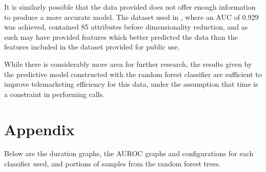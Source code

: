\documentclass[prodmode]{acmsmall} %
\begin{document}
It is similarly possible that the data provided does not offer enough
information to produce a more accurate model. The dataset used in \cite{paper}, where an
AUC of $0.929$ was achieved, contained 85 attributes before dimensionality
reduction, and as such may have provided features which better predicted the
data than the features included in the dataset provided for public use.

While there is considerably more area for further research, the results given by
the predictive model constructed with the random forest classifier are
sufficient to improve telemarketing efficiency for this data, under the
assumption that time is a constraint in performing calls. 




\section{Appendix}
Below are the duration graphs, the AUROC graphs and configurations for each
classifier used, and portions of samples from the random forest trees.
\newpage

\begin{figure}[!t]
\end{figure}
\end{document}
